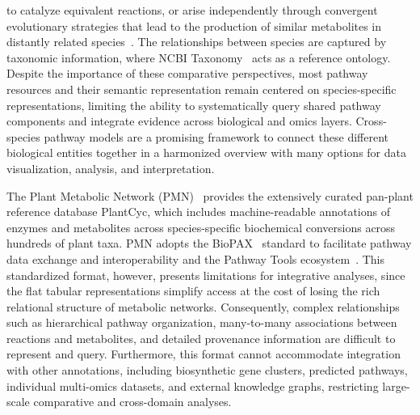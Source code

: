 \documentclass[11pt,a4paper]{article}
\begin{document}
to catalyze equivalent reactions, or arise independently through convergent evolutionary strategies
that lead to the production of similar metabolites in distantly related species~\cite{scossa2026}. The
relationships between species are captured by taxonomic information, where NCBI
Taxonomy~\cite{schoch2020} acts as a reference ontology. Despite the importance of these comparative
perspectives, most pathway resources and their semantic representation remain centered on
species-specific representations, limiting the ability to systematically query shared pathway
components and integrate evidence across biological and omics layers. Cross-species pathway models
are a promising framework to connect these different biological entities together in a harmonized
overview with many options for data visualization, analysis, and interpretation.

The Plant Metabolic Network (PMN)~\cite{hawkins2025} provides the extensively curated pan-plant
reference database PlantCyc, which includes machine-readable annotations of enzymes and metabolites
across species-specific biochemical conversions across hundreds of plant taxa. PMN adopts the
BioPAX~\cite{demir2010} standard to facilitate pathway data exchange and interoperability and the
Pathway Tools ecosystem~\cite{karp2021}. This standardized format, however, presents limitations for
integrative analyses, since the flat tabular representations simplify access at the cost of losing
the rich relational structure of metabolic networks. Consequently, complex relationships such as
hierarchical pathway organization, many-to-many associations between reactions and metabolites, and
detailed provenance information are difficult to represent and query. Furthermore, this format cannot
accommodate integration with other annotations, including biosynthetic gene clusters, predicted
pathways, individual multi-omics datasets, and external knowledge graphs, restricting large-scale
comparative and cross-domain analyses.
\end{document}
